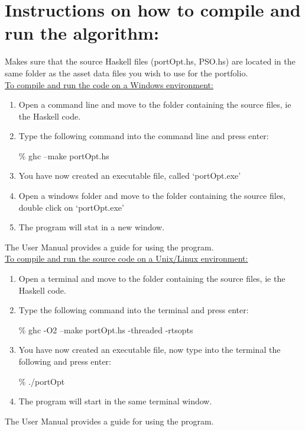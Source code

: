 \section*{Instructions on how to compile and run the algorithm:} 
  Makes sure that the source Haskell files (portOpt.hs, PSO.hs) are located in the same folder as the asset data files you wish to use for the portfolio.
  \\\underline{To compile and run the code on a Windows environment:}
  \begin{enumerate}
    \item Open a command line and move to the folder containing the source files, ie the Haskell code.
    \item Type the following command into the command line and press enter:
  \begin{center} \% ghc --make portOpt.hs \end{center}
    \item You have now created an executable file, called `portOpt.exe'
    \item Open a windows folder and move to the folder containing the source files, double click on `portOpt.exe'
    \item The program will stat in a new window.
  \end{enumerate}
  The User Manual provides a guide for using the program.
  \\\underline{To compile and run the source code on a Unix/Linux environment:}
  \begin{enumerate}
    \item Open a terminal and move to the folder containing the source files, ie the Haskell code.
    \item Type the following command into the terminal and press enter:
  \begin{center} \% ghc -O2 --make portOpt.hs -threaded -rtsopts \end{center}
    \item You have now created an executable file, now type into the terminal the following and press enter:
  \begin{center} \% ./portOpt \end{center}
    \item The program will start in the same terminal window.
  \end{enumerate}
  The User Manual provides a guide for using the program.

